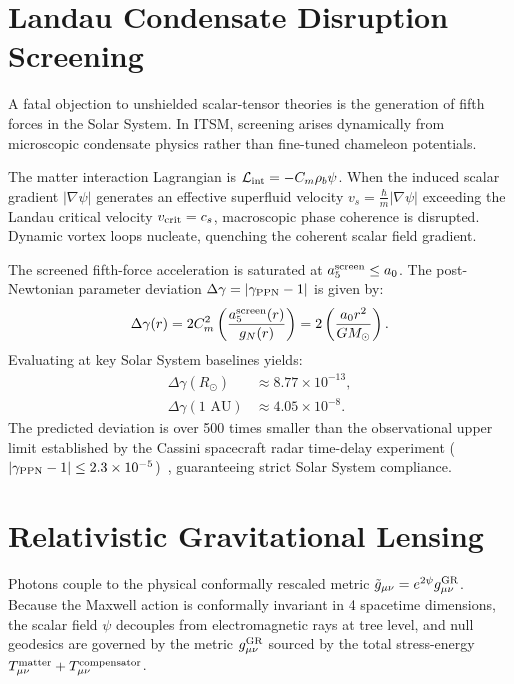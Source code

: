 \documentclass[aps,prd,twocolumn,superscriptaddress,nofootinbib,amsmath,amssymb]{revtex4-2}
\begin{document}
\section{Landau Condensate Disruption Screening}
\label{sec:scr}

A fatal objection to unshielded scalar-tensor theories is the generation of fifth forces in the Solar System. In ITSM, screening arises dynamically from microscopic condensate physics rather than fine-tuned chameleon potentials.

The matter interaction Lagrangian is $\mathcal{L}_{\rm int} = -C_m \rho_b \psi$. When the induced scalar gradient $|\nabla\psi|$ generates an effective superfluid velocity $v_s = \frac{\hbar}{m}|\nabla\psi|$ exceeding the Landau critical velocity $v_{\rm crit} = c_s$, macroscopic phase coherence is disrupted. Dynamic vortex loops nucleate, quenching the coherent scalar field gradient.

The screened fifth-force acceleration is saturated at $a_5^{\rm screen} \le a_0$. The post-Newtonian parameter deviation $\Delta\gamma = |\gamma_{\rm PPN} - 1|$ is given by:
\begin{equation}
\Delta\gamma(r) = 2 C_m^2 \left( \frac{a_5^{\rm screen}(r)}{g_N(r)} \right) = 2 \left( \frac{a_0 r^2}{G M_\odot} \right).
\end{equation}
Evaluating at key Solar System baselines yields:
\begin{align}
\Delta\gamma(R_\odot) &\approx 8.77 \times 10^{-13}, \\
\Delta\gamma(1\text{ AU}) &\approx 4.05 \times 10^{-8}.
\end{align}
The predicted deviation is over 500 times smaller than the observational upper limit established by the Cassini spacecraft radar time-delay experiment ($|\gamma_{\rm PPN} - 1| \le 2.3 \times 10^{-5}$)~\cite{bertotti2003}, guaranteeing strict Solar System compliance.

\section{Relativistic Gravitational Lensing}
\label{sec:len}

Photons couple to the physical conformally rescaled metric $\tilde{g}_{\mu\nu} = e^{2\psi} g_{\mu\nu}^{\rm GR}$. Because the Maxwell action is conformally invariant in 4 spacetime dimensions, the scalar field $\psi$ decouples from electromagnetic rays at tree level, and null geodesics are governed by the metric $g_{\mu\nu}^{\rm GR}$ sourced by the total stress-energy $T_{\mu\nu}^{\rm matter} + T_{\mu\nu}^{\rm compensator}$.
\end{document}
